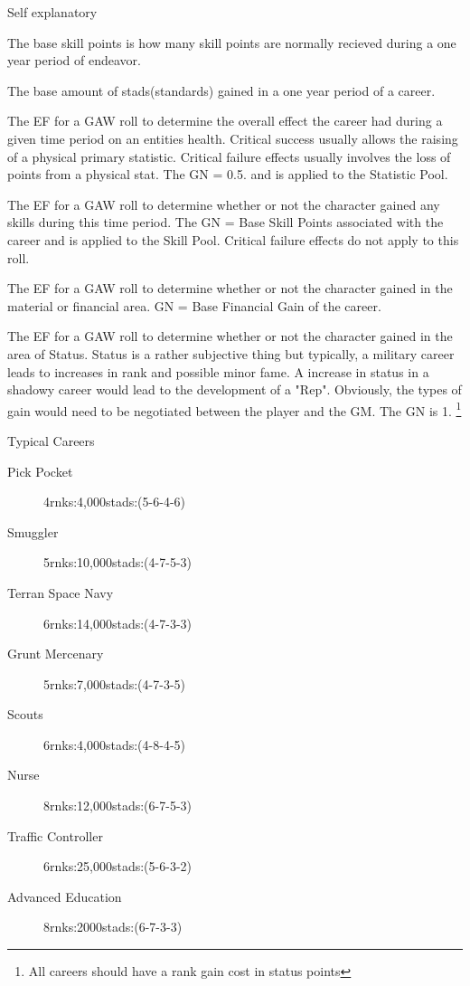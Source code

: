 \begin{description}
	\item [Name]
	Self explanatory
	\item[Base Skill Points]
	The base skill points is how many skill points are normally
	recieved during a one year period of endeavor.
	\item[Base Financial Gain]
	The base amount of stads(standards) gained in a one year period of a career.
	\item[Career Ease Factors (Stat|Skill|Wealth|Status)]
	\item[Stat]
	The EF for a GAW roll to determine the overall effect the career
	had during a given time period on an entities health. Critical
	success usually allows the raising of a physical primary
	statistic. Critical failure effects usually involves the loss of
	points from a physical stat. The GN = 0.5. and is applied to the 
	Statistic Pool.
	\item[Skill]
	The EF for a GAW roll to determine whether or not the character
	gained any skills during this time period. The GN = Base Skill 
	Points associated with the career and is applied to the Skill 
	Pool. Critical failure effects do not apply to this	roll.
	\item[Wealth]
	The EF for a GAW roll to determine whether or not the character
	gained in the material or financial area. GN = Base Financial 
	Gain of the career. 
	\item[Status]
	The EF for a GAW roll to determine whether or not the character
	gained in the area of Status. Status is a rather subjective thing
	but typically, a military career leads to increases in rank and
	possible minor fame. A increase in status in a shadowy career would
	lead to the development of a "Rep". Obviously, the types of gain would
	need to be negotiated between the player and the GM. The GN is 1.
	\footnote{All careers should have a rank gain cost in status points}
	\item Typical Careers
	\begin{description}
		\item[Pick Pocket]
		4rnks:4,000stads:(5-6-4-6) 
		\item[Smuggler]
		5rnks:10,000stads:(4-7-5-3)
		\item[Terran Space Navy]
		6rnks:14,000stads:(4-7-3-3)
		\item[Grunt Mercenary]
		5rnks:7,000stads:(4-7-3-5)
		\item[Scouts]
		6rnks:4,000stads:(4-8-4-5)
		\item[Nurse]
		8rnks:12,000stads:(6-7-5-3)
		\item[Traffic Controller]
		6rnks:25,000stads:(5-6-3-2)
		\item[Advanced Education]
		8rnks:2000stads:(6-7-3-3)
	\end{description}
\end{description}

